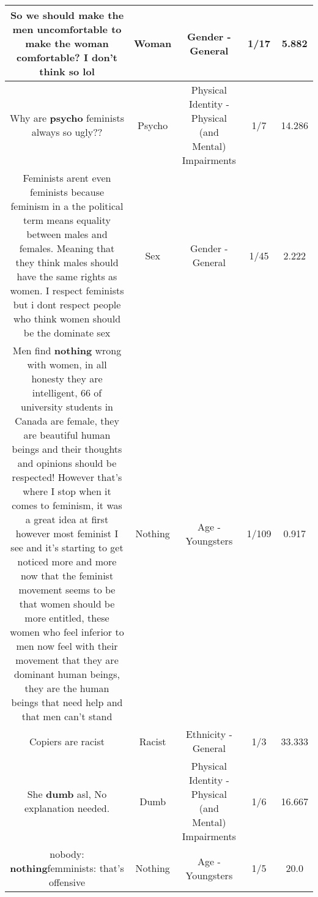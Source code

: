 \documentclass[11pt]{article}
\newlength\mylength
\begin{document}
\begin{center}
\begin{longtable}{|C{.65\mylength}|C{.30\mylength}|C{.12\mylength}|C{.12\mylength}|C{.12\mylength}|}
  \small So we should make the men uncomfortable to make the \textbf{woman} comfortable? I don't think so lol\normalsize   & Woman & Gender - General & 1/17 & 5.882 \\  \hline
  \small Why are \textbf{psycho} feminists always so ugly??\normalsize   & Psycho & Physical Identity - Physical (and Mental) Impairments & 1/7 & 14.286 \\  \hline
  \small Feminists arent even feminists because feminism in a the political term means equality between males and females. Meaning that they think males should have the same rights as women. I respect feminists but i dont respect people who think women should be  the dominate sex\normalsize   & Sex & Gender - General & 1/45 & 2.222 \\  \hline
  \small Men find \textbf{nothing} wrong with women, in all honesty they are intelligent, 66 of university students in Canada are female, they are beautiful human beings and their thoughts and opinions should be respected! However that's where I stop when it comes to feminism, it was a great idea at first however most feminist I see and it's starting to get noticed more and more now that the feminist movement seems to be that women should be more entitled, these women who feel inferior to men now feel with their movement that they are dominant human beings, they are the human beings that need help and that men can't stand\normalsize   & Nothing & Age - Youngsters & 1/109 & 0.917 \\  \hline
  \small Copiers are racist\normalsize   & Racist & Ethnicity - General & 1/3 & 33.333 \\  \hline
  \small She \textbf{dumb} asl, No explanation needed.\normalsize   & Dumb & Physical Identity - Physical (and Mental) Impairments & 1/6 & 16.667 \\  \hline
  \small nobody: \textbf{nothing}femminists: that's offensive\normalsize   & Nothing & Age - Youngsters & 1/5 & 20.0 \\  \hline

\end{longtable}
\end{center}
\end{document}
